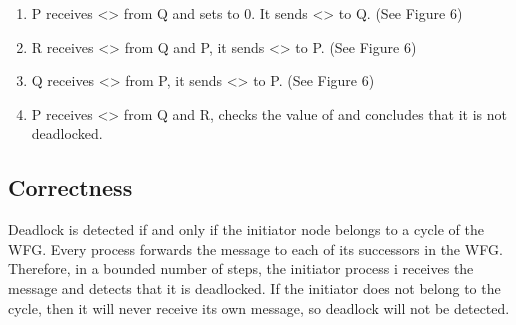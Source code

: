 \documentclass[letterpaper,10pt,english]{sphinxmanual}
\begin{document}
\begin{enumerate}
\item {} 
\sphinxAtStartPar
P receives \textless{}\textgreater{} from Q and sets  to 0. It sends \textless{}\textgreater{} to Q. (See Figure 6)

\item {} 
\sphinxAtStartPar
R receives \textless{}\textgreater{} from Q and P, it sends \textless{}\textgreater{} to P. (See Figure 6)

\item {} 
\sphinxAtStartPar
Q receives \textless{}\textgreater{} from P, it sends \textless{}\textgreater{} to P. (See Figure 6)

\item {} 
\sphinxAtStartPar
P receives \textless{}\textgreater{} from Q and R, checks the value of  and concludes that it is not deadlocked.

\end{enumerate}


\subsection{Correctness}
\label{\detokenize{docs/BrachaToueg/algorithm:correctness}}
\sphinxAtStartPar
Deadlock is detected if and only if the initiator node belongs to a cycle of the WFG. Every process forwards the message to each of its successors in the WFG. Therefore, in a bounded number of steps, the initiator process i receives the message and detects that it is deadlocked. If the initiator does not belong to the cycle, then it will never receive its own message, so deadlock will not be detected. 
\end{document}
